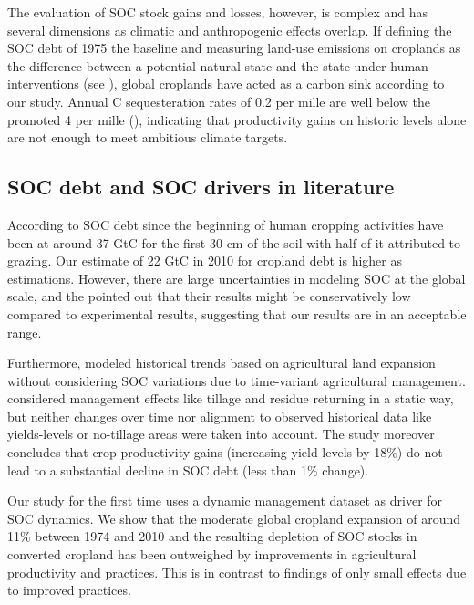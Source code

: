 \documentclass[gc, manuscript]{copernicus}
\begin{document}
The evaluation of SOC stock gains and losses, however, is complex and has several dimensions as climatic and anthropogenic effects overlap. If defining the SOC debt of 1975 the baseline and measuring land-use emissions on croplands as the difference between a potential natural state and the state under human interventions (see \citep{pugh_simulated_2015}), global croplands have acted as a carbon sink according to our study. Annual C sequesteration rates of 0.2 per mille are well below the promoted 4 per mille (\citep{minasny_soil_2017}), indicating that productivity gains on historic levels alone are not enough to meet ambitious climate targets.

\hypertarget{soc-debt-and-soc-drivers-in-literature}{%
\subsection{SOC debt and SOC drivers in literature}\label{soc-debt-and-soc-drivers-in-literature}}

According to \citep{sanderman_soil_2017} SOC debt since the beginning of human cropping activities have been at around 37 GtC for the first 30 cm of the soil with half of it attributed to grazing. Our estimate of 22 GtC in 2010 for cropland debt is higher as \citep{sanderman_soil_2017} estimations. However, there are large uncertainties in modeling SOC at the global scale, and the \citep{sanderman_soil_2017} pointed out that their results might be conservatively low compared to experimental results, suggesting that our results are in an acceptable range.

Furthermore, \citep{sanderman_soil_2017} modeled historical trends based on agricultural land expansion without considering SOC variations due to time-variant agricultural management. \citep{pugh_simulated_2015} considered management effects like tillage and residue returning in a static way, but neither changes over time nor alignment to observed historical data like yields-levels or no-tillage areas were taken into account. The study moreover concludes that crop productivity gains (increasing yield levels by 18\%) do not lead to a substantial decline in SOC debt (less than 1\% change).

Our study for the first time uses a dynamic management dataset as driver for SOC dynamics. We show that the moderate global cropland expansion of around 11\% between 1974 and 2010 and the resulting depletion of SOC stocks in converted cropland has been outweighed by improvements in agricultural productivity and practices. This is in contrast to \citep{pugh_simulated_2015} findings of only small effects due to improved practices.
\end{document}
